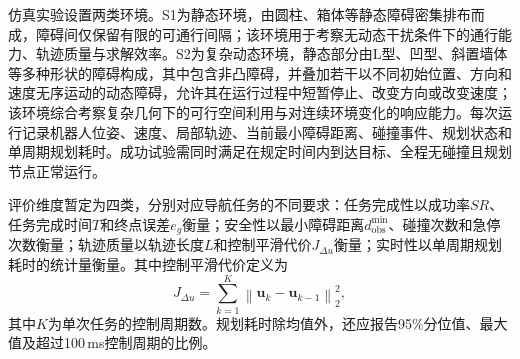 仿真实验设置两类环境。S1为静态环境，由圆柱、箱体等静态障碍密集排布而成，障碍间仅保留有限的可通行间隔；该环境用于考察无动态干扰条件下的通行能力、轨迹质量与求解效率。S2为复杂动态环境，静态部分由L型、凹型、斜置墙体等多种形状的障碍构成，其中包含非凸障碍，并叠加若干以不同初始位置、方向和速度无序运动的动态障碍，允许其在运行过程中短暂停止、改变方向或改变速度；该环境综合考察复杂几何下的可行空间利用与对连续环境变化的响应能力。每次运行记录机器人位姿、速度、局部轨迹、当前最小障碍距离、碰撞事件、规划状态和单周期规划耗时。成功试验需同时满足在规定时间内到达目标、全程无碰撞且规划节点正常运行。

评价维度暂定为四类，分别对应导航任务的不同要求：任务完成性以成功率$SR$、任务完成时间$T$和终点误差$e_g$衡量；安全性以最小障碍距离$d_{\mathrm{obs}}^{\min}$、碰撞次数和急停次数衡量；轨迹质量以轨迹长度$L$和控制平滑代价$J_{\Delta u}$衡量；实时性以单周期规划耗时的统计量衡量。其中控制平滑代价定义为
\begin{equation}
	J_{\Delta u}
	=
	\sum_{k=1}^{K}
	\left\|\mathbf{u}_{k}-\mathbf{u}_{k-1}\right\|_2^2,
	\label{eq:仿真控制平滑指标}
\end{equation}
其中$K$为单次任务的控制周期数。规划耗时除均值外，还应报告95\%分位值、最大值及超过100\,ms控制周期的比例。

